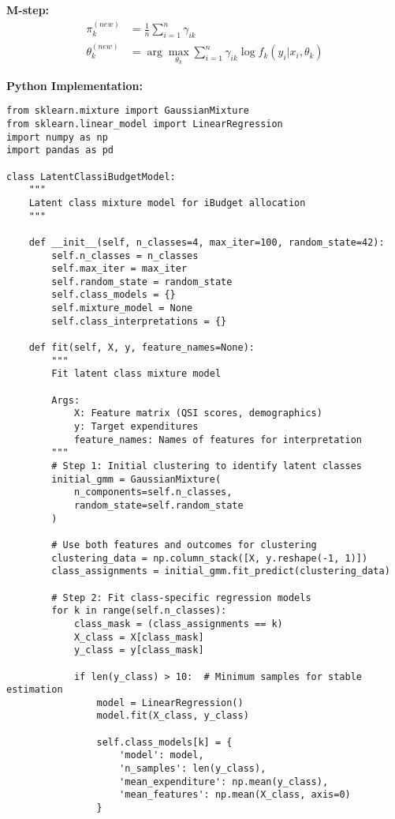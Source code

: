 \textbf{M-step:}
\begin{align}
\pi_k^{(new)} &= \frac{1}{n}\sum_{i=1}^{n} \gamma_{ik} \\
\theta_k^{(new)} &= \arg\max_{\theta_k} \sum_{i=1}^{n} \gamma_{ik} \log f_k(y_i | x_i, \theta_k)
\end{align}

\textbf{Python Implementation:}
\begin{lstlisting}
from sklearn.mixture import GaussianMixture
from sklearn.linear_model import LinearRegression
import numpy as np
import pandas as pd

class LatentClassiBudgetModel:
    """
    Latent class mixture model for iBudget allocation
    """
    
    def __init__(self, n_classes=4, max_iter=100, random_state=42):
        self.n_classes = n_classes
        self.max_iter = max_iter
        self.random_state = random_state
        self.class_models = {}
        self.mixture_model = None
        self.class_interpretations = {}
        
    def fit(self, X, y, feature_names=None):
        """
        Fit latent class mixture model
        
        Args:
            X: Feature matrix (QSI scores, demographics)
            y: Target expenditures
            feature_names: Names of features for interpretation
        """
        # Step 1: Initial clustering to identify latent classes
        initial_gmm = GaussianMixture(
            n_components=self.n_classes,
            random_state=self.random_state
        )
        
        # Use both features and outcomes for clustering
        clustering_data = np.column_stack([X, y.reshape(-1, 1)])
        class_assignments = initial_gmm.fit_predict(clustering_data)
        
        # Step 2: Fit class-specific regression models
        for k in range(self.n_classes):
            class_mask = (class_assignments == k)
            X_class = X[class_mask]
            y_class = y[class_mask]
            
            if len(y_class) > 10:  # Minimum samples for stable estimation
                model = LinearRegression()
                model.fit(X_class, y_class)
                
                self.class_models[k] = {
                    'model': model,
                    'n_samples': len(y_class),
                    'mean_expenditure': np.mean(y_class),
                    'mean_features': np.mean(X_class, axis=0)
                }
        

\end{lstlisting}
